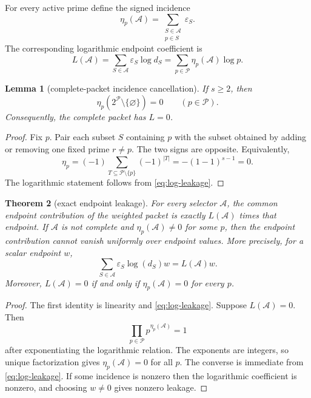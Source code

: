 \documentclass[11pt]{article}
\newtheorem{theorem}{Theorem}[section]
\newtheorem{lemma}[theorem]{Lemma}
\theoremstyle{definition}
\theoremstyle{remark}
\newcommand{\PP}{\mathcal P}
\newcommand{\Aset}{\mathcal A}
\begin{document}
For every active prime define the signed incidence
\begin{equation}
 \eta_p(\Aset)=\sum_{\substack{S\in\Aset\\p\in S}}\varepsilon_S.
 \label{eq:incidence}
\end{equation}
The corresponding logarithmic endpoint coefficient is
\begin{equation}
 L(\Aset)=\sum_{S\in\Aset}\varepsilon_S\log d_S
       =\sum_{p\in\PP}\eta_p(\Aset)\log p.
 \label{eq:log-leakage}
\end{equation}

\begin{lemma}[complete-packet incidence cancellation]
\label{lem:full-incidence}
If $s\geq 2$, then
\[
 \eta_p(2^{\PP}\setminus\{\varnothing\})=0
 \qquad(p\in\PP).
\]
Consequently, the complete packet has $L=0$.
\end{lemma}

\begin{proof}
Fix $p$.  Pair each subset $S$ containing $p$ with the subset obtained by
adding or removing one fixed prime $r\ne p$.  The two signs are opposite.
Equivalently,
\[
 \eta_p=(-1)\sum_{T\subseteq\PP\setminus\{p\}}(-1)^{|T|}
       =-(1-1)^{s-1}=0.
\]
The logarithmic statement follows from \eqref{eq:log-leakage}.
\end{proof}

\begin{theorem}[exact endpoint leakage]
\label{thm:leakage}
For every selector $\Aset$, the common endpoint contribution of the weighted
packet is exactly $L(\Aset)$ times that endpoint.  If $\Aset$ is not complete and
$\eta_p(\Aset)\ne0$ for some $p$, then the endpoint contribution cannot vanish
uniformly over endpoint values.  More precisely, for a scalar endpoint $w$,
\[
 \sum_{S\in\Aset}\varepsilon_S\log(d_S)w=L(\Aset)w.
 \label{eq:endpoint-term}
\]
Moreover, $L(\Aset)=0$ if and only if $\eta_p(\Aset)=0$ for every $p$.
\end{theorem}

\begin{proof}
The first identity is linearity and \eqref{eq:log-leakage}.  Suppose
$L(\Aset)=0$.  Then
\[
 \prod_{p\in\PP}p^{\eta_p(\Aset)}=1
\]
after exponentiating the logarithmic relation.  The exponents are integers,
so unique factorization gives $\eta_p(\Aset)=0$ for all $p$.  The converse is
immediate from \eqref{eq:log-leakage}.  If some incidence is nonzero then the
logarithmic coefficient is nonzero, and choosing $w\ne0$ gives nonzero leakage.
\end{proof}
\end{document}
